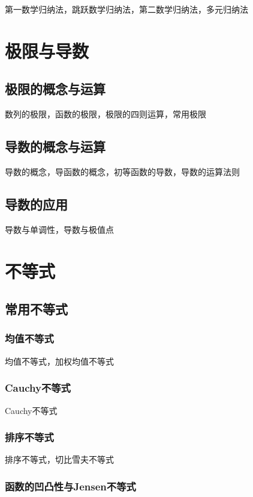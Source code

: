 \documentclass[lang=cn, zihao=4.5]{elegantbook}
\begin{document}
第一数学归纳法，跳跃数学归纳法，第二数学归纳法，多元归纳法

\chapter{极限与导数}

\section{极限的概念与运算}

数列的极限，函数的极限，极限的四则运算，常用极限

\section{导数的概念与运算}

导数的概念，导函数的概念，初等函数的导数，导数的运算法则

\section{导数的应用}

导数与单调性，导数与极值点

\chapter{不等式}

\section{常用不等式}

\subsection{均值不等式}

均值不等式，加权均值不等式

\subsection{Cauchy不等式}

Cauchy不等式

\subsection{排序不等式}

排序不等式，切比雪夫不等式

\subsection{函数的凹凸性与Jensen不等式}
\end{document}
